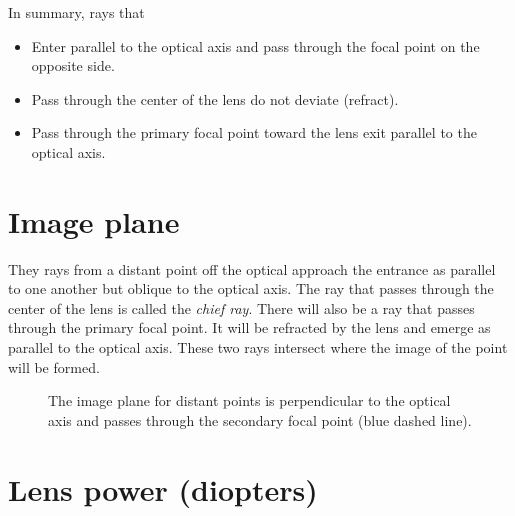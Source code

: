 \documentclass[
  letterpaper,
]{book}
\providecommand{\tightlist}{%
  \setlength{\itemsep}{0pt}\setlength{\parskip}{0pt}}\usepackage{longtable,booktabs,array}
\begin{document}
In summary, rays that

\begin{itemize}
\tightlist
\item
  Enter parallel to the optical axis and pass through the focal point on
  the opposite side.
\item
  Pass through the center of the lens do not deviate (refract).
\item
  Pass through the primary focal point toward the lens exit parallel to
  the optical axis.
\end{itemize}

\section{Image plane}\label{sec-optics-imageplane}

They rays from a distant point off the optical approach the entrance as
parallel to one another but oblique to the optical axis. The ray that
passes through the center of the lens is called the \emph{chief ray}.
There will also be a ray that passes through the primary focal point. It
will be refracted by the lens and emerge as parallel to the optical
axis. These two rays intersect where the image of the point will be
formed.

\begin{figure}


\caption{\label{fig-optics-focalplane}The image plane for distant points
is perpendicular to the optical axis and passes through the secondary
focal point (blue dashed line).}

\end{figure}%

\section{Lens power (diopters)}\label{sec-optics-lenspower}
\end{document}

